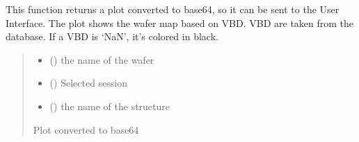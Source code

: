 \documentclass[letterpaper,10pt,english]{sphinxmanual}
\begin{document}

\begin{fulllineitems}
\label{\detokenize{VBD:VBD.create_wafer_map}}
\pysigstartsignatures
{}
\pysigstopsignatures
\sphinxAtStartPar
This function returns a plot converted to base64, so it can be sent to the User Interface. The plot shows the wafer map based on VBD.
VBD are taken from the database. If a VBD is ‘NaN’, it’s colored in black.
\begin{quote}\begin{description}
\begin{itemize}
\item {} 
\sphinxAtStartPar
{} () \textendash{} the name of the wafer

\item {} 
\sphinxAtStartPar
{} () \textendash{} Selected session

\item {} 
\sphinxAtStartPar
{} () \textendash{} the name of the structure

\end{itemize}

\sphinxAtStartPar
Plot converted to base64

\end{description}\end{quote}

\end{fulllineitems}

\end{document}
